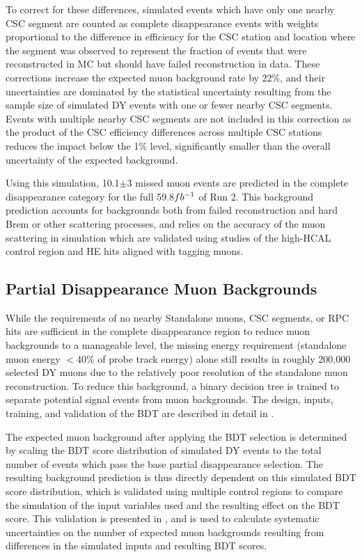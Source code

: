 To correct for these differences, simulated events which have only one nearby CSC segment are counted as complete disappearance events with weights proportional to the difference in efficiency for the CSC station and location where the segment was observed to represent the fraction of events that were reconstructed in MC but should have failed reconstruction in data.
These corrections increase the expected muon background rate by 22$\%$, and their uncertainties are dominated by the statistical uncertainty resulting from the sample size of simulated DY events with one or fewer nearby CSC segments.
Events with multiple nearby CSC segments are not included in this correction as the product of the CSC efficiency differences across multiple CSC stations reduces the impact below the 1$\%$ level, significantly smaller than the overall uncertainty of the expected background.

Using this simulation, 10.1$\pm$3 missed muon events are predicted in the complete disappearance category for the full 59.8$fb^{-1}$ of Run 2. 
This background prediction accounts for backgrounds both from failed reconstruction and hard Brem or other scattering processes, and relies on the accuracy of the muon scattering in simulation which are validated using studies of the high-HCAL control region and HE hits aligned with tagging muons.

\subsection{Partial Disappearance Muon Backgrounds}
While the requirements of no nearby Standalone muons, CSC segments, or RPC hits are sufficient in the complete disappearance region to reduce muon backgrounds to a manageable level, the missing energy requirement (standalone muon energy $<$40$\%$ of probe track energy) alone still results in roughly 200,000 selected DY muons due to the relatively poor resolution of the standalone muon reconstruction.
To reduce this background, a binary decision tree is trained to separate potential signal events from muon backgrounds. 
The design, inputs, training, and validation of the BDT are described in detail in .

The expected muon background after applying the BDT selection is determined by scaling the BDT score distribution of simulated DY events to the total number of events which pass the base partial disappearance selection.
The resulting background prediction is thus directly dependent on this simulated BDT score distribution, which is validated using multiple control regions to compare the simulation of the input variables used and the resulting effect on the BDT score.
This validation is presented in , and is used to calculate systematic uncertainties on the number of expected muon backgrounds resulting from differences in the simulated inputs and resulting BDT scores.

